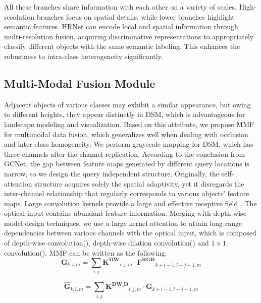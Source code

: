 \documentclass[lettersize,journal]{IEEEtran}
\begin{document}
All these branches share information with each other on a variety of scales. High-resolution branches focus on spatial details, while lower branches highlight semantic features. HRNet can encode local and spatial information through multi-resolution fusion, acquiring discriminative representations to appropriately classify different objects with the same semantic labeling. This enhances the robustness to intra-class heterogeneity significantly. 


\subsection{Multi-Modal Fusion Module}
Adjacent objects of various classes may exhibit a similar appearance, but owing to different heights, they appear distinctly in DSM, which is advantageous for landscape modeling and visualization. Based on this attribute, we propose MMF for multimodal data fusion, which generalizes well when dealing with occlusion and inter-class homogeneity. We perform grayscale mapping for DSM, which has three channels after the channel replication. According to the conclusion from GCNet\cite{caoGCNetNonlocalNetworks2019},  the gap between feature maps generated by different query locations is narrow, so we design the query independent structure. Originally, the self-attention structure acquires solely the spatial adaptivity, yet it disregards the inter-channel relationship that regularly corresponds to various objects' feature maps. Large convolution kernels provide a large and effective receptive field \cite{guoVisualAttentionNetwork2022}. The optical input contains abundant feature information. Merging with depth-wise \cite{sandlerMobileNetV2InvertedResiduals2019a} model design techniques, we use a large kernel attention to attain long-range dependencies between various channels with the optical input, which is composed of depth-wise convolution(), depth-wise dilation convolution() and $1 \times 1$ convolution(). MMF can be written as the following:
\begin{equation}
    \mathbf{G}_{k, l, m}=\sum_{i, j} \mathbf{K^{DW}}_{i, j, m} \cdot \mathbf{F^{RGB}}_{k+i-1, l+j-1, m} 
\label{eqDW}   
\end{equation}

\begin{equation}
    \hat{\mathbf{G}}_{k, l, m}=\sum_{i, j} \mathbf{K^{DW\_D}}_{i, j, m} \cdot \mathbf{G}_{k+i-1, l+j-1, m} 
\label{eqDWD}   
\end{equation}
\end{document}
